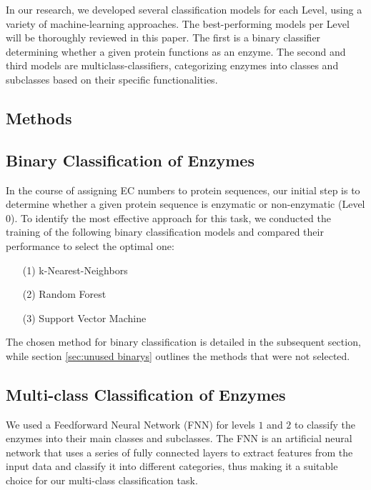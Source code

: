 \documentclass{bioinfo}
\begin{document}
In our research, we developed several classification models for each Level, using a variety of machine-learning approaches.
The best-performing models per Level will be thoroughly reviewed in this paper.
The first is a binary classifier determining whether a given protein functions as an enzyme. 
The second and third models are multiclass-classifiers, categorizing enzymes into classes and subclasses 
based on their specific functionalities. 

\clearpage
\begin{methods}
\section{Methods}

\subsection{Binary Classification of Enzymes}
In the course of assigning EC numbers to protein sequences,
our initial step is to determine whether a given protein sequence is enzymatic or non-enzymatic (Level $0$).
To identify the most effective approach for this task,
we conducted the training of the following binary classification models and compared their performance to select the optimal one:
\begin{enumerate}
	\item[(1)] k-Nearest-Neighbors
	\item[(2)] Random Forest 
	\item[(3)] Support Vector Machine
\end{enumerate}
The chosen method for binary classification is detailed in the subsequent section, while section \ref{sec:unused binarys} outlines the methods that were not selected.

\subsection{Multi-class Classification of Enzymes}
We used a Feedforward Neural Network (FNN) for levels $1$ and $2$ to classify the enzymes into their main classes and subclasses.
The FNN is an artificial neural network that uses a series of fully connected layers to extract features from the input data and classify it into different categories,
thus making it a suitable choice for our multi-class classification task. 


\end{methods}
\end{document}
